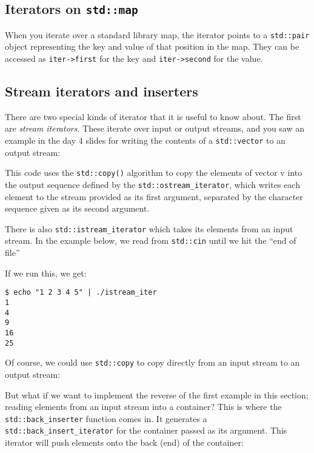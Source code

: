 \documentclass[a4paper]{scrartcl}
\begin{document}
\subsection{Iterators on \texttt{std::map}}
When you iterate over a standard library map, the iterator points to a \verb|std::pair| object representing the key and value of that position in the map. They can be accessed as \verb|iter->first| for the key and \verb|iter->second| for the value.

\subsection{Stream iterators and inserters}
There are two special kinds of iterator that it is useful to know about. The first are \emph{stream iterators}. These iterate over input or output streams, and you saw an example in the day 4 slides for writing the contents of a \verb|std::vector| to an output stream:



This code uses the \verb|std::copy()| algorithm to copy the elements of vector v into the output sequence defined by the \verb|std::ostream_iterator|, which writes each element to the stream provided as its first argument, separated by the character sequence given as its second argument.

There is also \verb|std::istream_iterator| which takes its elements from an input stream. In the example below, we read from \verb|std::cin| until we hit the ``end of file''



If we run this, we get:
\begin{verbatim}
$ echo "1 2 3 4 5" | ./istream_iter 
1
4
9
16
25
\end{verbatim}

Of course, we could use \verb|std::copy| to copy directly from an input stream to an output stream:



But what if we want to implement the reverse of the first example in this section; reading elements from an input stream into a container? This is where the \verb|std::back_inserter| function comes in. It generates a \verb|std::back_insert_iterator| for the container passed as its argument. This iterator will push elements onto the back (end) of the container:


\end{document}
